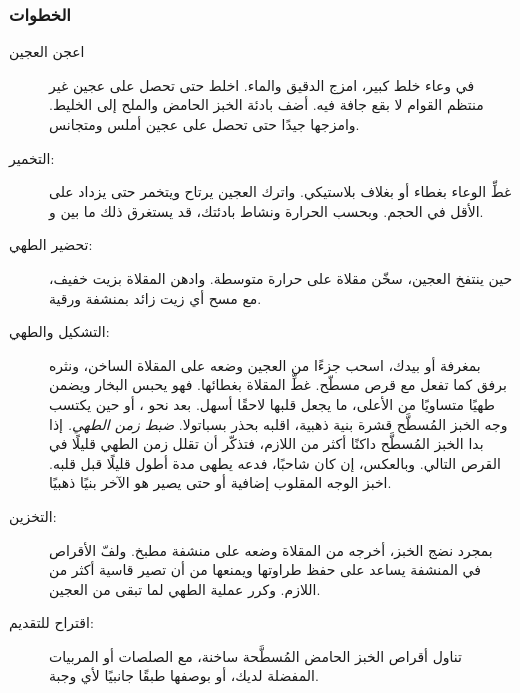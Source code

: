 \subsubsection*{الخطوات}

\begin{description}
\item[اعجن العجين] في وعاء خلط كبير، امزج الدقيق والماء. اخلط حتى تحصل على عجين غير منتظم القوام لا بقع جافة فيه. أضف بادئة الخبز الحامض والملح إلى الخليط. وامزجها جيدًا حتى تحصل على عجين أملس ومتجانس.
\item[التخمير:] غطِّ الوعاء بغطاء أو بغلاف بلاستيكي. واترك العجين يرتاح ويتخمر حتى يزداد  على الأقل في الحجم. وبحسب الحرارة ونشاط بادئتك، قد يستغرق ذلك ما بين  و.
\item[تحضير الطهي:] حين ينتفخ العجين، سخّن مقلاة على حرارة متوسطة. وادهن المقلاة بزيت خفيف، مع مسح أي زيت زائد بمنشفة ورقية.
\item[التشكيل والطهي:] بمغرفة أو بيدك، اسحب جزءًا من العجين وضعه على المقلاة الساخن، ونثره برفق كما تفعل مع قرص مسطّح. غطِّ المقلاة بغطائها. فهو يحبس البخار ويضمن طهيًا متساويًا من الأعلى، ما يجعل قلبها لاحقًا أسهل. بعد نحو ، أو حين يكتسب وجه الخبز المُسطَّح قشرة بنية ذهبية، اقلبه بحذر بسباتولا. \emph{ضبط زمن الطهي.} إذا بدا الخبز المُسطَّح داكنًا أكثر من اللازم، فتذكّر أن تقلل زمن الطهي قليلًا في القرص التالي. وبالعكس، إن كان شاحبًا، فدعه يطهى مدة أطول قليلًا قبل قلبه. اخبز الوجه المقلوب  إضافية أو حتى يصير هو الآخر بنيًا ذهبيًا.
\item[التخزين:] بمجرد نضج الخبز، أخرجه من المقلاة وضعه على منشفة مطبخ. ولفّ الأقراص في المنشفة يساعد على حفظ طراوتها ويمنعها من أن تصير قاسية أكثر من اللازم. وكرر عملية الطهي لما تبقى من العجين.
\item[اقتراح للتقديم:] تناول أقراص الخبز الحامض المُسطَّحة ساخنة، مع الصلصات أو المربيات المفضلة لديك، أو بوصفها طبقًا جانبيًا لأي وجبة.
\end{description}
